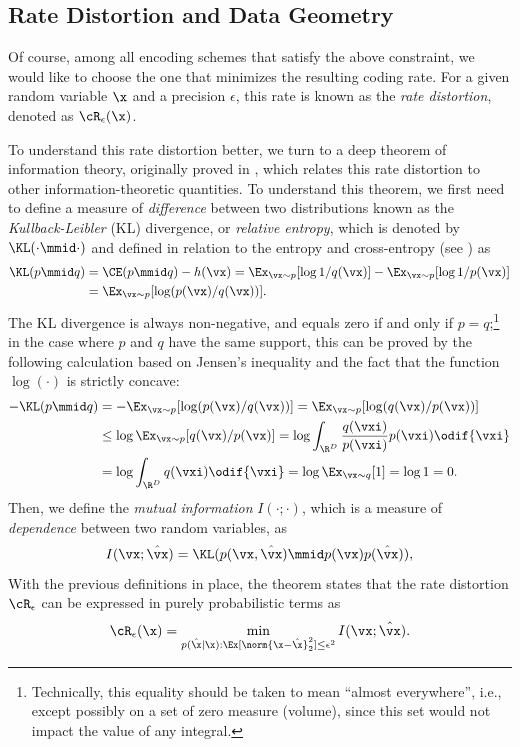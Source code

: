 \documentclass[../../book-main.tex]{subfiles}
\begin{document}
\subsection{Rate Distortion and Data Geometry}
Of course, among all encoding schemes that satisfy the above constraint, we
would like to choose the one that minimizes the resulting coding rate. For
a given random variable $\x$ and a precision $\epsilon$, this rate is known as
the \textit{rate distortion}, denoted as $\cR_{\epsilon}(\x)$.

To understand this rate distortion better, we turn to a deep theorem of information theory, originally proved in \textcite{shannon1959coding}, which relates this rate distortion to other information-theoretic quantities. To understand this theorem, we first need to define a measure of \textit{difference} between two distributions known as the \textit{Kullback-Leibler} (KL) divergence, or \textit{relative entropy}, which is denoted by \(\KL(\cdot \mmid \cdot)\) and defined in relation to the entropy and cross-entropy (see ) as
\begin{align}
	\KL(p \mmid q) &= \CE(p \mmid q) - h(\vx) = \Ex_{\vx \sim p}[\log 1/q(\vx)] - \Ex_{\vx \sim p}[\log 1/p(\vx)] \\
	&= \Ex_{\vx \sim p}[\log (p(\vx)/q(\vx))].
\end{align}
The KL divergence is always non-negative, and equals zero if and only if \(p = q\);\footnote{Technically, this equality should be taken to mean ``almost everywhere'', i.e., except possibly on a set of zero measure (volume), since this set would not impact the value of any integral.} in the case where \(p\) and \(q\) have the same support, this can be proved by the following calculation based on Jensen's inequality and the fact that the function \(\log(\cdot)\) is strictly concave:
\begin{align}
	- \KL(p\mmid q)
	&= -\Ex_{\vx \sim p}[\log(p(\vx)/q(\vx))] = \Ex_{\vx \sim p}[\log(q(\vx)/p(\vx))] \\
	&\leq \log \Ex_{\vx \sim p}[q(\vx)/p(\vx)] =  \log \int_{\R^{D}} \frac{q(\vxi)}{p(\vxi)}p(\vxi)\odif{\vxi} \\
	&= \log \int_{\R^{D}}q(\vxi)\odif{\vxi} = \log \Ex_{\vx \sim q}[1] = \log 1 = 0.
\end{align}
Then, we define the \textit{mutual information} \(I(\cdot; \cdot)\), which is a measure of \textit{dependence} between two random variables, as
\begin{equation}\label{eq:mutual-information}
	I(\vx; \hat{\vx})
	= \KL(p(\vx, \hat{\vx}) \mmid p(\vx) p(\hat{\vx})),
\end{equation}
With the previous definitions in place, the theorem states that the rate distortion \(\cR_{\epsilon}\) can be expressed in purely probabilistic terms as
\begin{equation}
	\cR_{\epsilon}(\x) 
	= \min_{p(\hat \x \mid \x): \Ex[\norm{\x -\hat \x}_2^{2}] \le \epsilon^{2}} 
	I(\vx; \hat{\vx}).
    \label{eqn:rate-distortion-general}
\end{equation}
\end{document}
